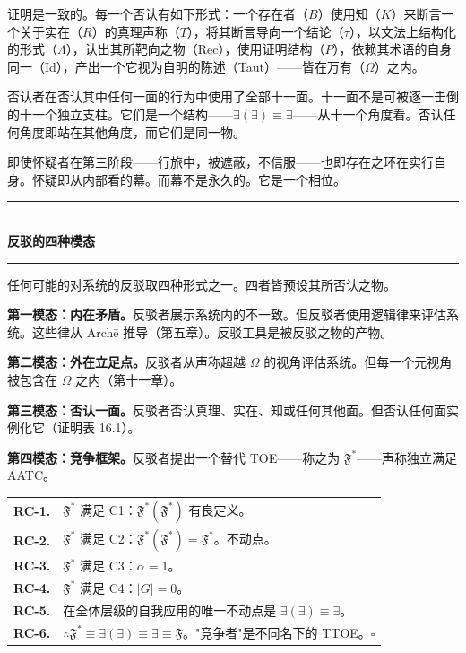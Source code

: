 \documentclass[10pt, openany, oneside]{book}
\renewcommand{\normalsize}{\fontsize{10}{13}\selectfont}
\renewcommand{\footnotesize}{\fontsize{8.5}{11}\selectfont}
\begin{document}
证明是一致的。每一个否认有如下形式：一个存在者（$B$）使用知（$K$）来断言一个关于实在（$R$）的真理声称（$T$），将其断言导向一个结论（$\tau$），以文法上结构化的形式（$\Lambda$），认出其所靶向之物（Rec），使用证明结构（$P$），依赖其术语的自身同一（Id），产出一个它视为自明的陈述（Taut）——皆在万有（$\Omega$）之内。

否认者在否认其中任何一面的行为中使用了全部十一面。十一面不是可被逐一击倒的十一个独立支柱。它们是一个结构——$\exists(\exists) \equiv \exists$——从十一个角度看。否认任何角度即站在其他角度，而它们是同一物。

即使怀疑者在第三阶段——行旅中，被遮蔽，不信服——也即存在之环在实行自身。怀疑即从内部看的幕。而幕不是永久的。它是一个相位。

\vspace{1.5em}


\begin{center}
    \rule{0.3\textwidth}{0.4pt}\\[0.5em]
    {\normalsize\bfseries\scshape 反驳的四种模态}\\[0.3em]
    \rule{0.3\textwidth}{0.4pt}
\end{center}

\vspace{1em}

\noindent 任何可能的对系统的反驳取四种形式之一。四者皆预设其所否认之物。

\textbf{第一模态：内在矛盾。}反驳者展示系统内的不一致。但反驳者使用逻辑律来评估系统。这些律从 Arch\={e} 推导（第五章）。反驳工具是被反驳之物的产物。

\textbf{第二模态：外在立足点。}反驳者从声称超越 $\Omega$ 的视角评估系统。但每一个元视角被包含在 $\Omega$ 之内（第十一章）。

\textbf{第三模态：否认一面。}反驳者否认真理、实在、知或任何其他面。但否认任何面实例化它（证明表 16.1）。

\textbf{第四模态：竞争框架。}反驳者提出一个替代 TOE——称之为 $\mathfrak{F}^*$——声称独立满足 AATC。

{\footnotesize
\noindent\begin{tabular}{r p{}}
\textbf{RC-1.} & $\mathfrak{F}^*$ 满足 C1：$\mathfrak{F}^*(\mathfrak{F}^*)$ 有良定义。\\[0.3em]
\textbf{RC-2.} & $\mathfrak{F}^*$ 满足 C2：$\mathfrak{F}^*(\mathfrak{F}^*) = \mathfrak{F}^*$。不动点。\\[0.3em]
\textbf{RC-3.} & $\mathfrak{F}^*$ 满足 C3：$\alpha = 1$。\\[0.3em]
\textbf{RC-4.} & $\mathfrak{F}^*$ 满足 C4：$|G| = 0$。\\[0.3em]
\textbf{RC-5.} & 在全体层级的自我应用的唯一不动点是 $\exists(\exists) \equiv \exists$。\\[0.3em]
\textbf{RC-6.} & $\therefore \mathfrak{F}^* \equiv \exists(\exists) \equiv \exists \equiv \mathfrak{F}$。"竞争者"是不同名下的 TTOE。$\square$ \\[0.3em]
\end{tabular}
}
\end{document}
